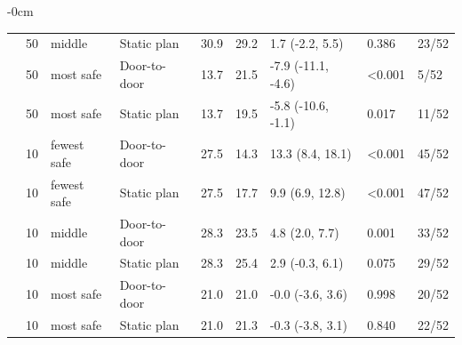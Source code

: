 \documentclass[sustainability,article,submit,pdftex,moreauthors]{Definitions/mdpi}
\begin{document}
\begin{table}[H]
\begin{adjustwidth}{-\extralength}{0cm}
\begin{tabular}{L{2.6cm}R{1.2cm}L{1.6cm}L{1.8cm}R{1.2cm}R{1.4cm}L{2.4cm}R{1.0cm}R{1.0cm}}
 & 50 & middle & Static plan & 30.9 & 29.2 & 1.7 (-2.2, 5.5) & 0.386 & 23/52 \\
 & 50 & most safe & Door-to-door & 13.7 & 21.5 & -7.9 (-11.1, -4.6) & <0.001 & 5/52 \\
 & 50 & most safe & Static plan & 13.7 & 19.5 & -5.8 (-10.6, -1.1) & 0.017 & 11/52 \\
 & 10 & fewest safe & Door-to-door & 27.5 & 14.3 & 13.3 (8.4, 18.1) & <0.001 & 45/52 \\
 & 10 & fewest safe & Static plan & 27.5 & 17.7 & 9.9 (6.9, 12.8) & <0.001 & 47/52 \\
 & 10 & middle & Door-to-door & 28.3 & 23.5 & 4.8 (2.0, 7.7) & 0.001 & 33/52 \\
 & 10 & middle & Static plan & 28.3 & 25.4 & 2.9 (-0.3, 6.1) & 0.075 & 29/52 \\
 & 10 & most safe & Door-to-door & 21.0 & 21.0 & -0.0 (-3.6, 3.6) & 0.998 & 20/52 \\
 & 10 & most safe & Static plan & 21.0 & 21.3 & -0.3 (-3.8, 3.1) & 0.840 & 22/52 \\
\bottomrule
\end{tabular}
\end{adjustwidth}
\end{table}
\end{document}
